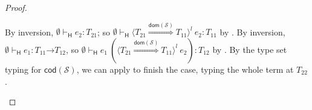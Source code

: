 \documentclass[9pt]{extarticle}
\newcommand{\ottnt}[1]{\mathit{#1}}
\begin{document}
{\begin{lemma}
\begin{proof}
{\begin{itemize}
\begin{itemize}
        By inversion, $ \emptyset   \vdash _{  \mathsf{H}  }  \ottnt{e_{{\mathrm{2}}}}  :  \ottnt{T_{{\mathrm{21}}}} $; so $ \emptyset   \vdash _{  \mathsf{H}  }   \langle  \ottnt{T_{{\mathrm{21}}}}  \mathord{ \overset{  \mathsf{dom} ( \mathcal{S} )  }{\Rightarrow} }  \ottnt{T_{{\mathrm{11}}}}  \rangle^{ \ottnt{l} } ~  \ottnt{e_{{\mathrm{2}}}}   :  \ottnt{T_{{\mathrm{11}}}} $ by . By
        inversion, $ \emptyset   \vdash _{  \mathsf{H}  }  \ottnt{e_{{\mathrm{1}}}}  :   \ottnt{T_{{\mathrm{11}}}} \mathord{ \rightarrow } \ottnt{T_{{\mathrm{12}}}}  $, so $ \emptyset   \vdash _{  \mathsf{H}  }   \ottnt{e_{{\mathrm{1}}}} ~  (  \langle  \ottnt{T_{{\mathrm{21}}}}  \mathord{ \overset{  \mathsf{dom} ( \mathcal{S} )  }{\Rightarrow} }  \ottnt{T_{{\mathrm{11}}}}  \rangle^{ \ottnt{l} } ~  \ottnt{e_{{\mathrm{2}}}}  )    :  \ottnt{T_{{\mathrm{12}}}} $ by .
By the type set typing for $ \mathsf{cod} ( \mathcal{S} ) $, we can apply 
        to finish the case, typing the whole term at $\ottnt{T_{{\mathrm{22}}}}$.


\end{itemize}
\end{itemize}}
\end{proof}
\end{lemma}}
\end{document}
